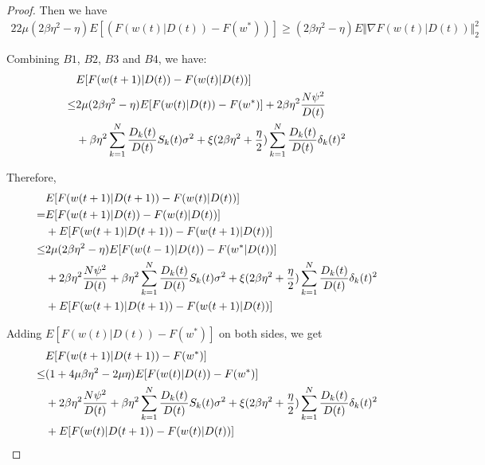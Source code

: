 \documentclass{article}
\theoremstyle{plain}
\theoremstyle{definition}
\theoremstyle{remark}
\begin{document}
\begin{proof}
  Then we have
  \begin{alignat}{2}
    2\mu (2\beta\eta^2 - \eta)E[(F(w(t)|D(t))-F(w^*))] \geq (2\beta \eta^2 - \eta) E{\Vert\nabla F(w(t)|D(t))\Vert}_2^2
  \end{alignat}

  Combining $B1$, $B2$, $B3$ and $B4$, we have:
  \begin{align}
         & E[F(w(t+1)|D(t)) - F(w(t)|D(t))] \notag \\
    \leq & 2 \mu(2\beta\eta^2-\eta)E[F(w(t)|D(t))-F(w^*)] + 2\beta\eta^2 \frac{N\psi^2}{D(t)} \notag \\
         & + \beta\eta^2 \sum_{k=1}^{N} \frac{D_k(t)}{D(t)} S_k(t) \sigma^2 + \xi(2\beta\eta^2 + \frac{\eta}{2}) \sum_{k=1}^{N} \frac{D_k(t)}{D(t)} \delta_k(t)^2
  \end{align}

  Therefore,
  \begin{align}
         & E[F(w(t+1)|D(t+1))-F(w(t)|D(t))] \notag \\
    =    & E[F(w(t+1)|D(t))-F(w(t)|D(t))] \notag \\
         & + E[F(w(t+1)|D(t+1))-F(w(t+1)|D(t))] \notag \\
    \leq & 2 \mu(2\beta\eta^2-\eta)E[F(w(t-1)|D(t))-F(w^*|D(t))] \notag \\
         & + 2\beta\eta^2 \frac{N\psi^2}{D(t)} + \beta\eta^2 \sum_{k=1}^{N} \frac{D_k(t)}{D(t)} S_k(t) \sigma^2 + \xi(2\beta\eta^2 + \frac{\eta}{2}) \sum_{k=1}^{N} \frac{D_k(t)}{D(t)} \delta_k(t)^2 \notag \\
         & + E[F(w(t+1)|D(t+1))-F(w(t+1)|D(t))]
  \end{align}

  Adding $E[F(w(t)|D(t))-F(w^*)]$ on both sides, we get
  \begin{align}
         & E[F(w(t+1)|D(t+1)) - F(w^*)] \notag \\
    \leq & (1+4\mu\beta\eta^2-2\mu\eta)E[F(w(t)|D(t))-F(w^*)] \notag \\
         & + 2\beta\eta^2 \frac{N\psi^2}{D(t)} + \beta\eta^2 \sum_{k=1}^{N} \frac{D_k(t)}{D(t)} S_k(t) \sigma^2 + \xi(2\beta\eta^2 + \frac{\eta}{2}) \sum_{k=1}^{N} \frac{D_k(t)}{D(t)} \delta_k(t)^2 \notag \\
         & + E[F(w(t)|D(t+1)) - F(w(t)|D(t))] \notag \\
  \end{align}


\end{proof}
\end{document}
